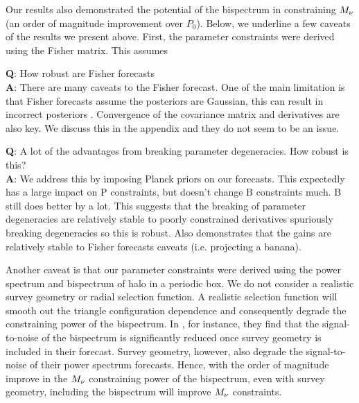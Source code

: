 Our results also demonstrated the potential of 
the bispectrum in constraining $M_\nu$ (an order of magnitude improvement over 
$P_0$). Below, we underline a few caveats of the results we present above. 
First, the parameter constraints were derived using the Fisher matrix. This 
assumes 

{\bf Q}: How robust are Fisher forecasts \\ 
{\bf A}: There are many caveats to the Fisher forecast. One of the main limitation is that 
Fisher forecasts assume the posteriors are Gaussian, this can result in incorrect posteriors \cite{wolz2012}. 
Convergence of the covariance matrix and derivatives are also key. We discuss this in the appendix
and they do not seem to be an issue. 

{\bf Q}: A lot of the advantages from breaking parameter degeneracies. How robust is this? \\
{\bf A}: We address this by imposing Planck priors on our forecasts. This expectedly has a 
large impact on P constraints, but doesn't change B constraints much. B still does better 
by a lot. This suggests that the breaking of parameter degeneracies are relatively stable 
to poorly constrained derivatives spuriously breaking degeneracies so this is robust. Also 
demonstrates that the gains are relatively stable to Fisher forecasts caveats 
(i.e. projecting a banana). 

Another caveat is that our parameter constraints were derived using the power 
spectrum and bispectrum of halo in a periodic box. We do not consider a 
realistic survey geometry or radial selection function. A realistic selection 
function will smooth out the triangle configuration dependence and consequently 
degrade the constraining power of the bispectrum. In \cite{sefusatti2005}, for 
instance, they find that the signal-to-noise of the bispectrum is significantly 
reduced once survey geometry is included in their forecast. Survey geometry, 
however, also degrade the signal-to-noise of their power spectrum forecasts. 
Hence, with the order of magnitude improve in the $M_\nu$ constraining power 
of the bispectrum, even with survey geometry, including the bispectrum will 
improve $M_\nu$ constraints. 

